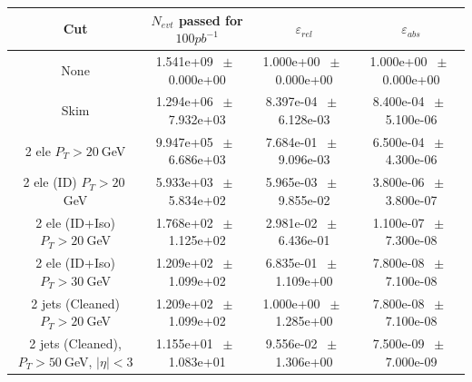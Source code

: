 \begin{table}[htbp] 
\begin{center} 
\begin{tabular}{|c|c|c|c|} 
\hline\hline 
 Cut & $N_{evt}$ passed for $100pb^{-1}$ & $\varepsilon_{rel}$ & $\varepsilon_{abs}$ \\ 
\hline\hline 
None          &           1.541e+09          $~\pm~$          0.000e+00           &           1.000e+00          $~\pm~$          0.000e+00           &           1.000e+00          $~\pm~$          0.000e+00          \\          
          Skim          &           1.294e+06          $~\pm~$          7.932e+03           &           8.397e-04          $~\pm~$          6.128e-03           &           8.400e-04          $~\pm~$          5.100e-06          \\          
          2 ele $P_T>20~$GeV          &           9.947e+05          $~\pm~$          6.686e+03           &           7.684e-01          $~\pm~$          9.096e-03           &           6.500e-04          $~\pm~$          4.300e-06          \\          
          2 ele (ID) $P_T>20~$GeV          &           5.933e+03          $~\pm~$          5.834e+02           &           5.965e-03          $~\pm~$          9.855e-02           &           3.800e-06          $~\pm~$          3.800e-07          \\          
          2 ele (ID+Iso) $P_T>20~$GeV          &           1.768e+02          $~\pm~$          1.125e+02           &           2.981e-02          $~\pm~$          6.436e-01           &           1.100e-07          $~\pm~$          7.300e-08          \\          
          2 ele (ID+Iso) $P_T>30~$GeV          &           1.209e+02          $~\pm~$          1.099e+02           &           6.835e-01          $~\pm~$          1.109e+00           &           7.800e-08          $~\pm~$          7.100e-08          \\          
          2 jets (Cleaned) $P_T>20~$GeV          &           1.209e+02          $~\pm~$          1.099e+02           &           1.000e+00          $~\pm~$          1.285e+00           &           7.800e-08          $~\pm~$          7.100e-08          \\          
          2 jets (Cleaned), $P_T>50~$GeV, $ | \eta |<3$          &           1.155e+01          $~\pm~$          1.083e+01           &           9.556e-02          $~\pm~$          1.306e+00           &           7.500e-09          $~\pm~$          7.000e-09          \\          

\end{tabular}
\end{center}
\end{table}
